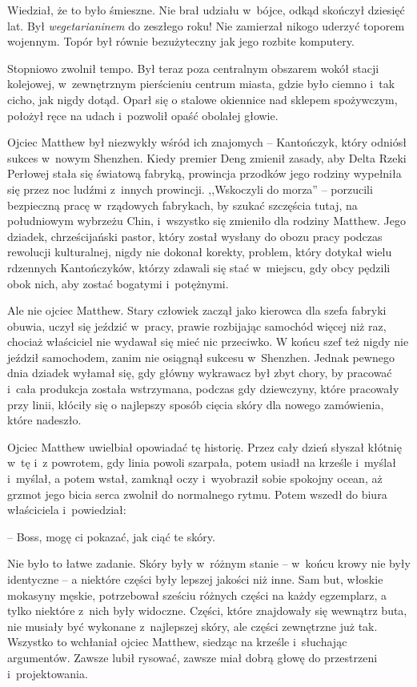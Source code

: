 \documentclass[oneside,polish,11pt,rmheadings]{mwbk}
\begin{document}
Wiedział, że to było śmieszne. Nie brał udziału w~bójce, odkąd skończył dziesięć lat. Był \textit{wegetarianinem} do zeszłego roku! Nie zamierzał nikogo uderzyć toporem wojennym. Topór był równie bezużyteczny jak jego rozbite komputery. 


Stopniowo zwolnił tempo. Był teraz poza centralnym obszarem wokół stacji kolejowej, w~zewnętrznym pierścieniu centrum miasta, gdzie było ciemno i~tak cicho, jak nigdy dotąd. Oparł się o stalowe okiennice nad sklepem spożywczym, położył ręce na udach i~pozwolił opaść obolałej głowie. 


Ojciec Matthew był niezwykły wśród ich znajomych -- Kantończyk, który odniósł sukces w~nowym Shenzhen. Kiedy premier Deng zmienił zasady, aby Delta Rzeki Perłowej stała się światową fabryką, prowincja przodków jego rodziny wypełniła się przez noc ludźmi z~innych prowincji. ,,Wskoczyli do morza'' -- porzucili bezpieczną pracę w~rządowych fabrykach, by szukać szczęścia tutaj, na południowym wybrzeżu Chin, i~wszystko się zmieniło dla rodziny Matthew. Jego dziadek, chrześcijański pastor, który został wysłany do obozu pracy podczas rewolucji kulturalnej, nigdy nie dokonał korekty, problem, który dotykał wielu rdzennych Kantończyków, którzy zdawali się stać w~miejscu, gdy obcy pędzili obok nich, aby zostać bogatymi i~potężnymi. 


Ale nie ojciec Matthew. Stary człowiek zaczął jako kierowca dla szefa fabryki obuwia, uczył się jeździć w~pracy, prawie rozbijając samochód więcej niż raz, chociaż właściciel nie wydawał się mieć nic przeciwko. W końcu szef też nigdy nie jeździł samochodem, zanim nie osiągnął sukcesu w~Shenzhen. Jednak pewnego dnia dziadek wyłamał się, gdy główny wykrawacz był zbyt chory, by pracować i~cała produkcja została wstrzymana, podczas gdy dziewczyny, które pracowały przy linii, kłóciły się o najlepszy sposób cięcia skóry dla nowego zamówienia, które nadeszło. 


Ojciec Matthew uwielbiał opowiadać tę historię. Przez cały dzień słyszał kłótnię w~tę i~z powrotem, gdy linia powoli szarpała, potem usiadł na krześle i~myślał i~myślał, a potem wstał, zamknął oczy i~wyobraził sobie spokojny ocean, aż grzmot jego bicia serca zwolnił do normalnego rytmu. Potem wszedł do biura właściciela i~powiedział: 

-- Boss, mogę ci pokazać, jak ciąć te skóry. 


Nie było to łatwe zadanie. Skóry były w~różnym stanie -- w~końcu krowy nie były identyczne -- a niektóre części były lepszej jakości niż inne. Sam but, włoskie mokasyny męskie, potrzebował sześciu różnych części na każdy egzemplarz, a tylko niektóre z~nich były widoczne. Części, które znajdowały się wewnątrz buta, nie musiały być wykonane z~najlepszej skóry, ale części zewnętrzne już tak. Wszystko to wchłaniał ojciec Matthew, siedząc na krześle i~słuchając argumentów. Zawsze lubił rysować, zawsze miał dobrą głowę do przestrzeni i~projektowania. 
\end{document}
